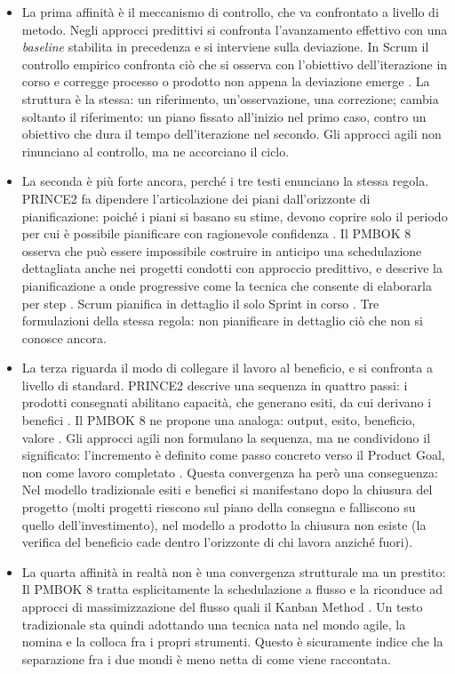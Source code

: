 \begin{itemize}
\item La prima affinit\`a \`e il meccanismo di controllo, che va confrontato a
livello di metodo. Negli approcci predittivi si confronta l'avanzamento
effettivo con una \emph{baseline} stabilita in precedenza e si interviene sulla
deviazione. In Scrum il controllo empirico confronta ci\`o che si osserva con
l'obiettivo dell'iterazione in corso e corregge processo o prodotto non appena
la deviazione emerge \cite{scrumguide2020}. La struttura \`e la stessa: un
riferimento, un'osservazione, una correzione; cambia soltanto il
riferimento: un piano fissato all'inizio nel primo caso, contro un obiettivo che dura
il tempo dell'iterazione nel secondo. Gli approcci agili non rinunciano al
controllo, ma ne accorciano il ciclo.

\item La seconda \`e pi\`u forte ancora, perch\'e i tre testi enunciano la
stessa regola. PRINCE2 fa dipendere l'articolazione dei piani dall'orizzonte di
pianificazione: poich\'e i piani si basano su stime, devono coprire solo il
periodo per cui \`e possibile pianificare con ragionevole confidenza
\cite{prince27}. Il PMBOK 8 osserva che pu\`o essere impossibile costruire in
anticipo una schedulazione dettagliata anche nei progetti condotti con approccio
predittivo, e descrive la pianificazione a onde progressive come la tecnica che
consente di elaborarla per step \cite{pmbok8}. Scrum pianifica in dettaglio il
solo Sprint in corso \cite{scrumguide2020}. Tre formulazioni della stessa
regola: non pianificare in dettaglio ci\`o che non si conosce ancora.

\item La terza riguarda il modo di collegare il lavoro al beneficio, e si
confronta a livello di standard. PRINCE2 descrive una sequenza in quattro
passi: i prodotti consegnati abilitano capacit\`a, che generano esiti, da cui
derivano i benefici \cite{prince27}. Il PMBOK 8 ne propone una analoga:
output, esito, beneficio, valore \cite{pmbok8}.
Gli approcci agili non formulano la sequenza, ma ne
condividono il significato: l'incremento \`e definito come passo concreto verso
il Product Goal, non come lavoro completato \cite{scrumguide2020}.
Questa convergenza ha per\`o una conseguenza: Nel modello tradizionale esiti e benefici si
manifestano dopo la chiusura del progetto (molti progetti
riescono sul piano della consegna e falliscono su quello dell'investimento), nel
modello a prodotto la chiusura non esiste (la verifica del beneficio cade
dentro l'orizzonte di chi lavora anzich\'e fuori).

\item La quarta affinit\`a in realt\`a non \`e una convergenza strutturale ma un prestito:
Il PMBOK 8 tratta esplicitamente la schedulazione a flusso e la riconduce ad
approcci di massimizzazione del flusso quali il Kanban Method \cite{pmbok8}.
Un testo tradizionale sta quindi adottando una tecnica nata
nel mondo agile, la nomina e la colloca fra i propri strumenti.
Questo \`e sicuramente indice che la separazione fra i due mondi \`e
meno netta di come viene raccontata.

\end{itemize}

